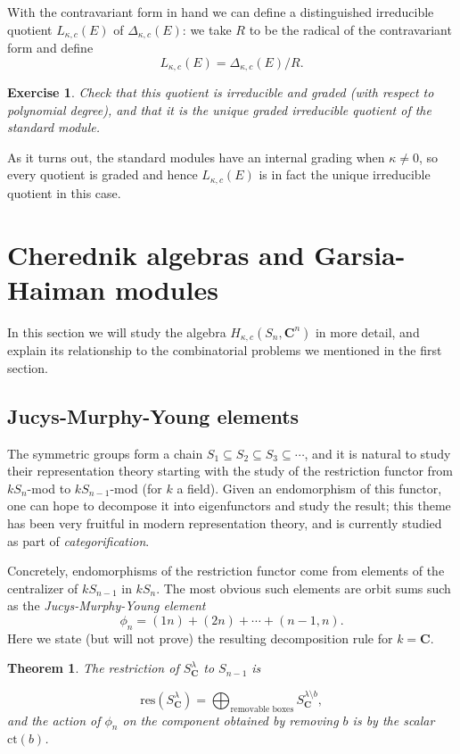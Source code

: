 \documentclass[12pt, reqno]{amsart}
\numberwithin{equation}{section}
\theoremstyle{definition}
\theoremstyle{plain}
\newtheorem{theorem}{Theorem}[section]
\newtheorem{exercise}{Exercise}
\newcommand{\CC}{\mathbf{C}}
\begin{document}
With the contravariant form in hand we can define a distinguished irreducible quotient $L_{\kappa,c}(E)$ of $\Delta_{\kappa,c}(E)$: we take $R$ to be the radical of  the contravariant form and define
$$L_{\kappa,c}(E)=\Delta_{\kappa,c}(E)/R.$$

\begin{exercise}
Check that this quotient is irreducible and graded (with respect to polynomial degree), and that it is the unique graded irreducible quotient of the standard module.\end{exercise}
As it turns out, the standard modules have an internal grading when $\kappa \neq 0$, so every quotient is graded and hence $L_{\kappa,c}(E)$ is in fact the unique irreducible quotient in this case.

\section{Cherednik algebras and Garsia-Haiman modules}

In this section we will study the algebra $H_{\kappa,c}(S_n,\CC^n)$ in more detail, and explain its relationship to the combinatorial problems we mentioned in the first section.

\subsection{Jucys-Murphy-Young elements} The symmetric groups form a chain $S_1 \subseteq S_2 \subseteq S_3 \subseteq \cdots$, and it is natural to study their representation theory starting with the study of the restriction functor from $k S_n$-mod to $k S_{n-1}$-mod (for $k$ a field). Given an endomorphism of this functor, one can hope to decompose it into eigenfunctors and study the result; this theme has been very fruitful in modern representation theory, and is currently studied as part of \emph{categorification}. 

Concretely, endomorphisms of the restriction functor come from elements of the centralizer of $k S_{n-1}$ in $k S_n$. The most obvious such elements are orbit sums such as the \emph{Jucys-Murphy-Young element} 
$$\phi_n=(1n)+(2n)+\cdots+(n-1,n).$$ Here we state (but will not prove) the resulting decomposition rule for $k=\CC$.
\begin{theorem}
The restriction of $S^\lambda_\CC$ to $S_{n-1}$ is

$$\mathrm{res}(S^\lambda_\CC)=\bigoplus_{\text{removable boxes}} S^{\lambda \setminus b}_\CC,$$ and the action of $\phi_n$ on the component obtained by removing $b$ is by the scalar $\mathrm{ct}(b)$.
\end{theorem}
 
\end{document}
